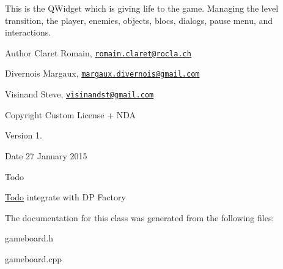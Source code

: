 This is the Q\+Widget which is giving life to the game. Managing the level transition, the player, enemies, objects, blocs, dialogs, pause menu, and interactions. \begin{DoxyAuthor}{Author}
Claret Romain, \href{mailto:romain.claret@rocla.ch}{\tt romain.\+claret@rocla.\+ch} 

Divernois Margaux, \href{mailto:margaux.divernois@gmail.com}{\tt margaux.\+divernois@gmail.\+com} 

Visinand Steve, \href{mailto:visinandst@gmail.com}{\tt visinandst@gmail.\+com} 
\end{DoxyAuthor}
\begin{DoxyCopyright}{Copyright}
Custom License + N\+D\+A 
\end{DoxyCopyright}
\begin{DoxyVersion}{Version}
1. 
\end{DoxyVersion}
\begin{DoxyDate}{Date}
27 January 2015 
\end{DoxyDate}
\begin{DoxyRefDesc}{Todo}
\item[\hyperlink{todo__todo000005}{Todo}]integrate with D\+P Factory \end{DoxyRefDesc}


The documentation for this class was generated from the following files\+:\begin{DoxyCompactItemize}
\item 
gameboard.\+h\item 
gameboard.\+cpp\end{DoxyCompactItemize}
